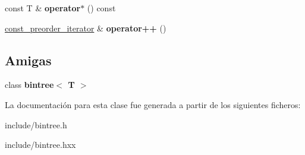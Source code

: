 \begin{DoxyCompactItemize}
\item 
const T \& {\bfseries operator$\ast$} () const \hypertarget{classbintree_1_1const__preorder__iterator_ab7d6e7ecc72ff63aaaf9219e7b7f930b}{}\label{classbintree_1_1const__preorder__iterator_ab7d6e7ecc72ff63aaaf9219e7b7f930b}

\item 
\hyperlink{classbintree_1_1const__preorder__iterator}{const\+\_\+preorder\+\_\+iterator} \& {\bfseries operator++} ()\hypertarget{classbintree_1_1const__preorder__iterator_af522a06205187003a8e96fca23b946fe}{}\label{classbintree_1_1const__preorder__iterator_af522a06205187003a8e96fca23b946fe}

\end{DoxyCompactItemize}
\subsection*{Amigas}
\begin{DoxyCompactItemize}
\item 
class {\bfseries bintree$<$ T $>$}\hypertarget{classbintree_1_1const__preorder__iterator_a300e602ae13bd21fa092c5a5899e9eda}{}\label{classbintree_1_1const__preorder__iterator_a300e602ae13bd21fa092c5a5899e9eda}

\end{DoxyCompactItemize}


La documentación para esta clase fue generada a partir de los siguientes ficheros\+:\begin{DoxyCompactItemize}
\item 
include/bintree.\+h\item 
include/bintree.\+hxx\end{DoxyCompactItemize}
